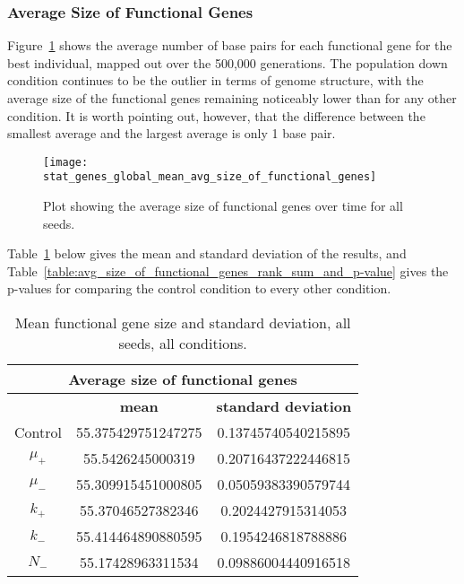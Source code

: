 \subsubsection{Average Size of Functional Genes}\label{sec:average_size_functional_genes}
Figure~\ref{fig:mean_functional_gene_size} shows the average number of base pairs for each functional gene for the best individual, mapped out over the 500,000 generations. The population down condition continues to be the outlier in terms of genome structure, with the average size of the functional genes remaining noticeably lower than for any other condition. It is worth pointing out, however, that the difference between the smallest average and the largest average is only 1 base pair. 
\begin{figure}[H]
	\centering
	\texttt{[image: stat\_genes\_global\_mean\_avg\_size\_of\_functional\_genes]}
	\caption[Average size of functional genes]{Plot showing the average size of functional genes over time for all seeds.}
	\label{fig:mean_functional_gene_size}
\end{figure}
Table~\ref{table:mean_functional_gene_size_and_std_dev} below gives the mean and standard deviation of the results, and Table~\ref{table:avg_size_of_functional_genes_rank_sum_and_p-value} gives the p-values for comparing the control condition to every other condition. 

\begin{table}[H]
	\centering
	\begin{tabular}{|c|c|c|}
		\hline
		\multicolumn{3}{c}{\Large \textbf{Average size of functional genes}} \\
		\hline
		& \textbf{mean} & \textbf{standard deviation} \\
		\hline
		Control & 55.375429751247275 & 0.13745740540215895 \\
		\hline
		$\mu_+$ & 55.5426245000319 & 0.20716437222446815\\ 
		\hline
		$\mu_-$ & 55.309915451000805 & 0.05059383390579744 \\
		\hline
		$k_+$ & 55.37046527382346 & 0.2024427915314053 \\
		\hline
		$k_-$ & 55.414464890880595 & 0.1954246818788886 \\
		\hline
		$N_-$ & 55.17428963311534	& 0.09886004440916518 \\
		\hline
	\end{tabular}
	\caption[Mean functional gene size and standard deviation]{Mean functional gene size and standard deviation, all seeds, all conditions.}
	\label{table:mean_functional_gene_size_and_std_dev}
\end{table}

